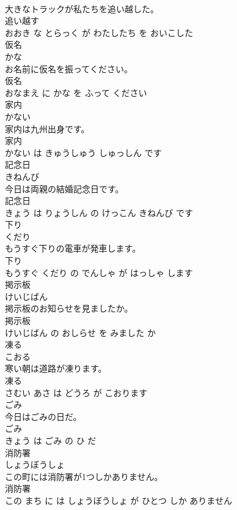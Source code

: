 \documentclass[8pt]{extreport}
\begin{document}
\begin{CJK}{UTF8}{min}
\\	大きなトラックが私たちを追い越した。	
\\	追い越す 
\\	おおき な とらっく が わたしたち を おいこした			
\\	仮名	
\\	かな			
\\	お名前に仮名を振ってください。	
\\	仮名 
\\	おなまえ に かな を ふって ください			
\\	家内	
\\	かない			
\\	家内は九州出身です。	
\\	家内 
\\	かない は きゅうしゅう しゅっしん です			
\\	記念日	
\\	きねんび			
\\	今日は両親の結婚記念日です。	
\\	記念日 
\\	きょう は りょうしん の けっこん きねんび です			
\\	下り	
\\	くだり			
\\	もうすぐ下りの電車が発車します。	
\\	下り 
\\	もうすぐ くだり の でんしゃ が はっしゃ します			
\\	掲示板	
\\	けいじばん			
\\	掲示板のお知らせを見ましたか。	
\\	掲示板 
\\	けいじばん の おしらせ を みました か			
\\	凍る	
\\	こおる			
\\	寒い朝は道路が凍ります。	
\\	凍る 
\\	さむい あさ は どうろ が こおります			
\\	ごみ	
\\	今日はごみの日だ。	
\\	ごみ 
\\	きょう は ごみ の ひ だ			
\\	消防署	
\\	しょうぼうしょ			
\\	この町には消防署が1つしかありません。	
\\	消防署 
\\	この まち に は しょうぼうしょ が ひとつ しか ありません			

\end{CJK}
\end{document}
